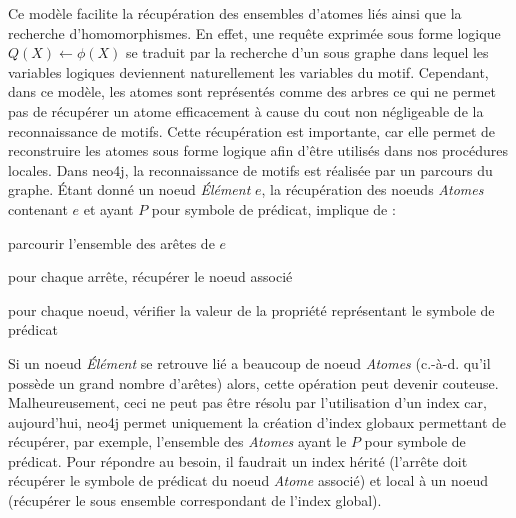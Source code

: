Ce modèle facilite la récupération des ensembles d'atomes liés ainsi que la recherche d'homomorphismes.
En effet, une requête exprimée sous forme logique $Q(X) \gets \phi(X)$ se traduit par la recherche d'un sous graphe dans lequel les variables logiques deviennent naturellement les variables du motif.
Cependant, dans ce modèle, les atomes sont représentés comme des arbres ce qui ne permet pas de récupérer un atome efficacement à cause du cout non négligeable de la reconnaissance de motifs.
Cette récupération est importante, car elle permet de reconstruire les atomes sous forme logique afin d'être utilisés dans nos procédures locales.
Dans \gls{neo4j}, la reconnaissance de motifs est réalisée par un parcours du graphe.
Étant donné un noeud \textit{Élément} $e$, la récupération des noeuds \textit{Atomes} contenant $e$ et ayant $P$ pour symbole de prédicat, implique de :
\begin{enumerate*}
    \item parcourir l'ensemble des arêtes de $e$
    \item pour chaque arrête, récupérer le noeud associé
    \item pour chaque noeud, vérifier la valeur de la propriété représentant le symbole de prédicat
\end{enumerate*}
Si un noeud \textit{Élément} se retrouve lié a beaucoup de noeud \textit{Atomes} (c.-à-d. qu'il possède un grand nombre d'arêtes) alors, cette opération peut devenir couteuse.
Malheureusement, ceci ne peut pas être résolu par l'utilisation d'un index car, aujourd'hui, \gls{neo4j} permet uniquement la création d'index globaux permettant de récupérer, par exemple, l'ensemble des \textit{Atomes} ayant le $P$ pour symbole de prédicat.
Pour répondre au besoin, il faudrait un index hérité (l'arrête doit récupérer le symbole de prédicat du noeud \textit{Atome} associé) et local à un noeud (récupérer le sous ensemble correspondant de l'index global).

